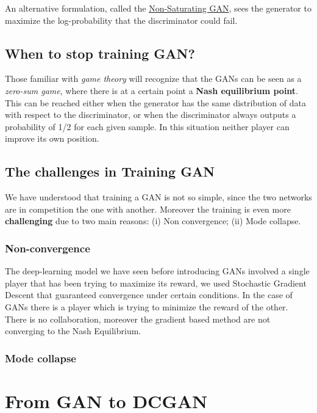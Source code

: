 An alternative formulation, called the \underline{Non-Saturating GAN}, sees the generator to maximize the log-probability that the discriminator could fail. 

\subsection{When to stop training GAN?}
Those familiar with \textit{game theory} will recognize that the GANs can be seen as a \textit{zero-sum game}, where there is at a certain point a \textbf{Nash equilibrium point}. This can be reached either when the generator has the same distribution of data with respect to the discriminator, or when the discriminator always outputs a probability of 1/2 for each given sample. In this situation neither player can improve its own position.

\subsection{The challenges in Training GAN}
We have understood that training a GAN is not so simple, since the two networks are in competition the one with another. Moreover the training is even more \textbf{challenging} due to two main reasons: (i) Non convergence; (ii) Mode collapse.

\subsubsection{Non-convergence}
The deep-learning model we have seen before introducing GANs involved a single player that has been trying to maximize its reward, we used Stochastic Gradient Descent that guaranteed convergence under certain conditions. In the case of GANs there is a player which is trying to minimize the reward of the other. There is no collaboration, moreover the gradient based method are not converging to the Nash Equilibrium.

\subsubsection{Mode collapse}

\section{From GAN to DCGAN}